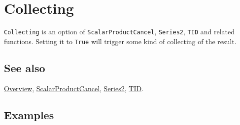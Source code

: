 \documentclass[../FeynCalcManual.tex]{subfiles}
\begin{document}
\hypertarget{collecting}{
\section{Collecting}\label{collecting}}

\texttt{Collecting} is an option of \texttt{ScalarProductCancel},
\texttt{Series2}, \texttt{TID} and related functions. Setting it to
\texttt{True} will trigger some kind of collecting of the result.

\subsection{See also}

\hyperlink{toc}{Overview},
\hyperlink{scalarproductcancel}{ScalarProductCancel},
\hyperlink{series2}{Series2}, \hyperlink{tid}{TID}.

\subsection{Examples}
\end{document}
